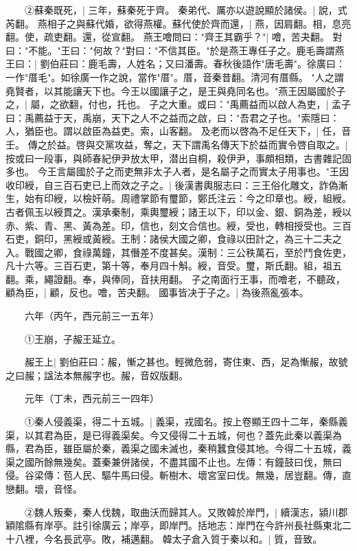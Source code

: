 　　②蘇秦既死，|{
	三年，蘇秦死于齊。
	}
秦弟代、厲亦以遊說顯於諸侯。|{
	說，式芮翻。
	}
燕相子之與蘇代婚，欲得燕權。蘇代使於齊而還，|{
	燕，因肩翻。相，息亮翻。使，疏吏翻。還，從宣翻。
	}
燕王噲問曰："齊王其霸乎？"|{
	噲，苦夬翻。
	}
對曰："不能。"王曰："何故？"對曰："不信其臣。"於是燕王專任子之。鹿毛壽謂燕王曰：|{
	劉伯莊曰：鹿毛壽，人姓名；又曰潘壽。春秋後語作"唐毛壽"。徐廣曰：一作"厝毛"。如徐廣一作之說，當作"厝"。厝，音秦昔翻。清河有厝縣。
	}
"人之謂堯賢者，以其能讓天下也。今王以國讓子之，是王與堯同名也。"燕王因屬國於子之，|{
	屬，之欲翻，付也，托也。
	}
子之大重。或曰："禹薦益而以啟人為吏，|{
	孟子曰：禹薦益于天，禹崩，天下之人不之益而之啟，曰："吾君之子也。"索隱曰：人，猶臣也。謂以啟臣為益吏。索，山客翻。
	}
及老而以啓為不足任天下，|{
	任，音壬。
	}
傳之於益。啓與交黨攻益，奪之，天下謂禹名傳天下於益而實令啓自取之。|{
	按或曰一段事，與師春紀伊尹放太甲，潜出自桐，殺伊尹，事頗相類，古書雜記固多也。
	}
今王言屬國於子之而吏無非太子人者，是名屬子之而實太子用事也。"王因收印綬，自三百石吏已上而效之子之。|{
	後漢書輿服志曰：三王俗化雕文，詐偽漸生，始有印綬，以檢奸萌。周禮掌節有璽節，鄭氏注云：今之印章也。綬，組綬。古者佩玉以綬貫之。漢承秦制，乘輿璽綬；諸王以下，印以金、銀、銅為差，綬以赤、紫、青、黑、黃為差。印，信也，刻文合信也。綬，受也，轉相授受也。三百石吏，銅印，黑綬或黃綬。王制：諸侯大國之卿，食祿以田計之，為三十二夫之入。戰國之卿，食祿萬鐘，其僭差不度甚矣。漢制：三公秩萬石，至於鬥食佐吏，凡十六等。三百石吏，第十等，奉月四十斛。綬，音受。璽，斯氏翻。組，祖五翻。乘，繩證翻。奉，與俸同，音扶用翻。
	}
子之南面行王事，而噲老，不聽政，顧為臣，|{
	顧，反也。噲，苦夬翻。
	}
國事皆决于子之。|{
	為後燕亂張本。
	}

　　六年（丙午，西元前三一五年）

　　①王崩，子赧王延立。

　　赧王上|{
	劉伯莊曰：赧，慚之甚也。輕微危弱，寄住東、西，足為慚赧，故號之曰赧；諡法本無赧字也。赧，音奴版翻。
	}

　　元年（丁未，西元前三一四年）

　　①秦人侵義渠，得二十五城。|{
	義渠，戎國名。按上卷顯王四十二年，秦縣義渠，以其君為臣，是已得義渠矣。今又侵得二十五城，何也？蓋先此秦以義渠為縣，君為臣，雖臣屬於秦，義渠之國未滅也，秦稍蠶食侵其地。今得二十五城，義渠之國所餘無幾矣。蓋秦兼併諸侯，不盡其國不止也。左傳：有鐘鼓曰伐，無曰侵。谷梁傳：苞人民、驅牛馬曰侵。斬樹木、壞宮室曰伐。無幾，居豈翻。傳，直戀翻。壞，音怪。
	}

　　②魏人叛秦，秦人伐魏，取曲沃而歸其人。又敗韓於岸門，|{
	續漢志，潁川郡穎隂縣有岸亭。註引徐廣云；岸亭，即岸門。括地志：岸門在今許州長社縣東北二十八裡，今名長武亭。敗，補邁翻。
	}
韓太子倉入質于秦以和。|{
	質，音致。
	}

